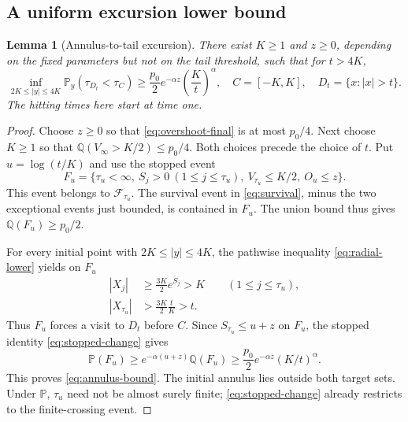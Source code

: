 \documentclass[11pt,a4paper]{article}
\numberwithin{equation}{section}
\newtheorem{lemma}[theorem]{Lemma}
\theoremstyle{remark}
\newcommand{\Pp}{\mathbb P}
\newcommand{\Q}{\mathbb Q}
\begin{document}
\subsection{A uniform excursion lower bound}

\begin{lemma}[Annulus-to-tail excursion]\label{lem:excursion}
There exist $K\ge1$ and $z\ge0$, depending on the fixed parameters but
not on the tail threshold, such that for $t>4K$,
\begin{equation}
 \inf_{2K\le|y|\le4K}\Pp_y(\tau_{D_t}<\tau_C)
 \ge\frac{p_0}{2}e^{-\alpha z}\left(\frac Kt\right)^\alpha,
 \quad C=[-K,K],\quad D_t=\{x:|x|>t\}.
 \label{eq:annulus-bound}
\end{equation}
The hitting times here start at time one.
\end{lemma}

\begin{proof}
Choose $z\ge0$ so that \eqref{eq:overshoot-final} is at most $p_0/4$.
Next choose $K\ge1$ so that $\Q(V_\infty>K/2)\le p_0/4$.
Both choices precede the choice of $t$. Put $u=\log(t/K)$ and use the
stopped event
\begin{equation}
 F_u=\{\tau_u<\infty,\ S_j>0\ (1\le j\le\tau_u),\
           V_{\tau_u}\le K/2,\ O_u\le z\}.
 \label{eq:stopped-event}
\end{equation}
This event belongs to $\mathcal F_{\tau_u}$. The survival event in
\eqref{eq:survival}, minus the two exceptional events just bounded,
is contained in $F_u$. The union bound thus gives $\Q(F_u)\ge p_0/2$.

For every initial point with $2K\le|y|\le4K$, the pathwise inequality
\eqref{eq:radial-lower} yields on $F_u$
\begin{align}
 |X_j|&\ge\frac{3K}{2}e^{S_j}>K\qquad(1\le j\le\tau_u),
 \nonumber\\
 |X_{\tau_u}|&>\frac{3K}{2}\frac tK>t.\label{eq:excursion-path}
\end{align}
Thus $F_u$ forces a visit to $D_t$ before $C$. Since
$S_{\tau_u}\le u+z$ on $F_u$, the stopped identity
\eqref{eq:stopped-change} gives
\begin{equation}
 \Pp(F_u)\ge e^{-\alpha(u+z)}\Q(F_u)
 \ge\frac{p_0}{2}e^{-\alpha z}(K/t)^\alpha.
 \label{eq:excursion-likelihood}
\end{equation}
This proves \eqref{eq:annulus-bound}. The initial annulus lies outside
both target sets. Under $\Pp$, $\tau_u$ need not be almost surely finite;
\eqref{eq:stopped-change} already restricts to the finite-crossing event.
\end{proof}
\end{document}
